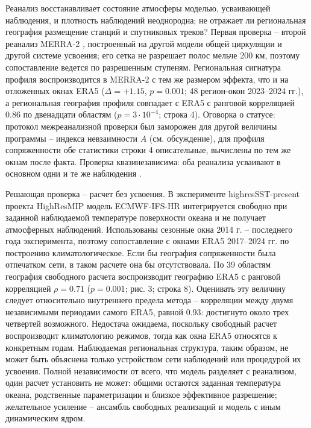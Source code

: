 \documentclass[12pt,a4paper]{article}
\begin{document}
Реанализ восстанавливает состояние атмосферы моделью, усваивающей наблюдения, и плотность наблюдений неоднородна; не отражает ли региональная география размещение станций и спутниковых треков? Первая проверка -- второй реанализ MERRA-2 \cite{Gelaro2017}, построенный на другой модели общей циркуляции и другой системе усвоения; его сетка не разрешает полос мельче 200 км, поэтому сопоставление ведется по разрешенным ступеням. Региональная сигнатура профиля воспроизводится в MERRA-2 с тем же размером эффекта, что и на отложенных окнах ERA5 ($\Delta = +1.15$, $p = 0.001$; 48 регион-окон 2023--2024 гг.), а региональная география профиля совпадает с ERA5 с ранговой корреляцией 0.86 по двенадцати областям ($p = 3 \cdot 10^{-4}$; строка 4). Оговорка о статусе: протокол межреанализной проверки был заморожен для другой величины программы -- индекса невзаимности $A$ (см. обсуждение), для профиля сопряженности обе статистики строки 4 описательные, вычислены по тем же окнам после факта. Проверка квазинезависима: оба реанализа усваивают в основном одни и те же наблюдения \cite{Hersbach2020,Gelaro2017}.

Решающая проверка -- расчет без усвоения. В эксперименте highresSST-present проекта HighResMIP \cite{Haarsma2016} модель ECMWF-IFS-HR \cite{Roberts2018} интегрируется свободно при заданной наблюдаемой температуре поверхности океана и не получает атмосферных наблюдений. Использованы сезонные окна 2014 г. -- последнего года эксперимента, поэтому сопоставление с окнами ERA5 2017--2024 гг. по построению климатологическое. Если бы география сопряженности была отпечатком сети, в таком расчете она бы отсутствовала. По 39 областям география свободного расчета воспроизводит географию ERA5 с ранговой корреляцией $\rho = 0.71$ ($p = 0.001$; рис. 3; строка 8). Оценивать эту величину следует относительно внутреннего предела метода -- корреляции между двумя независимыми периодами самого ERA5, равной 0.93: достигнуто около трех четвертей возможного. Недостача ожидаема, поскольку свободный расчет воспроизводит климатологию режимов, тогда как окна ERA5 относятся к конкретным годам. Наблюдаемая региональная структура, таким образом, не может быть объяснена только устройством сети наблюдений или процедурой их усвоения. Полной независимости от всего, что модель разделяет с реанализом, один расчет установить не может: общими остаются заданная температура океана, родственные параметризации и близкое эффективное разрешение; желательное усиление -- ансамбль свободных реализаций и модель с иным динамическим ядром.
\end{document}
